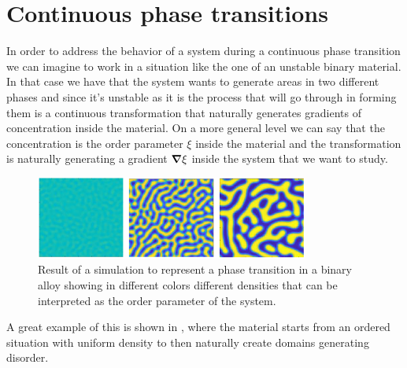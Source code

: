 \section{Continuous phase transitions}

In order to address the behavior of a system during a continuous phase transition we can imagine to work in a situation like the one of an unstable binary material. In that case we have that the system wants to generate areas in two different phases and since it's unstable as it is the process that will go through in forming them is a continuous transformation that naturally generates gradients of concentration inside the material. On a more general level we can say that the concentration is the order parameter $\xi$ inside the material and the transformation is naturally generating a gradient $\grad \xi$ inside the system that we want to study. 
\begin{figure}[b]
    \centering
    \includegraphics[width=0.8\textwidth]{Immagini/ContPhaseTrans.png}
    \caption{
        Result of a simulation to represent a phase transition in a binary alloy showing in different colors different densities that can be interpreted as the order parameter of the system.
    }
    \label{fig:ContPhaseTrans}
\end{figure}
A great example of this is shown in , where the material starts from an ordered situation with uniform density to then naturally create domains generating disorder.

